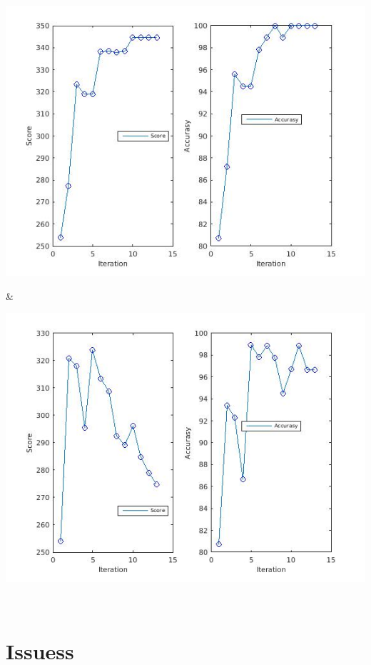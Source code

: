 \documentclass[
	fontsize=12pt,
	paper=a4,
	twoside=false,
	numbers=noenddot,
	plainheadsepline,
	toc=listof,
	toc=bibliography
]{scrartcl}
\begin{document}
\begin{landscape}
\begin{table}
\begin{tabular}
		\parbox[b]{1em}{
			\includegraphics[scale = 0.28]{fig/method1/test3/accuracy_LL.jpg}}  &
		\parbox[b]{1em}{
			\includegraphics[scale = 0.28]{fig/method2/test3/accuracy_LL.jpg}} \\
		\hline			
		
	\end{tabular}
\end{table}




\end{landscape}

\section{Issuess}



	
\end{document}
